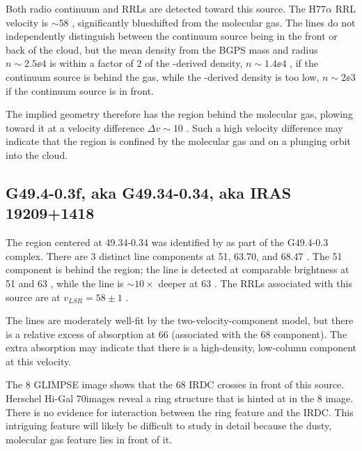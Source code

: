 Both radio continuum and RRLs are detected toward this source.  The H77$\alpha$
RRL velocity is $\sim58$ \kms, significantly blueshifted from the molecular
gas.  The \formaldehyde lines do not independently distinguish between the
continuum source being in the front or back of the cloud, but the mean density
from the BGPS mass and radius $n\sim2.5\ee{4}$ \percc is within a factor of 2
of the \formaldehyde-derived density, $n\sim1.4\ee{4}$ \percc, if the continuum
source is behind the gas, while the \formaldehyde-derived density is too low,
$n\sim2\ee{3}$ \percc if the continuum source is in front.

The implied geometry therefore has the \hii region behind the molecular gas,
plowing toward it at a velocity difference $\Delta v \sim 10$ \kms.  Such a
high velocity difference may indicate that the \hii region is confined by the
molecular gas and on a plunging orbit into the cloud.

\subsection{G49.4-0.3f, aka G49.34-0.34, aka IRAS 19209+1418}
The \hii region centered at 49.34-0.34 was identified by \citet{Mehringer1994a}
as part of the G49.4-0.3 complex.  There are 3 distinct \formaldehyde line
components at 51, 63.70, and 68.47 \kms.  The 51 \kms component is behind the \hii
region; the \thirteenco line is detected at comparable brightness at 51 \kms
and 63 \kms, while the \formaldehyde \oneone line is $\sim10\times$ deeper at
63 \kms.  The RRLs associated with this source are at $v_{LSR}=58 \pm 1$ \kms.

The \formaldehyde lines are moderately well-fit by the two-velocity-component
model, but there is a relative excess of \twotwo absorption at 66 \kms
(associated with the 68 \kms component).  The extra absorption may indicate
that there is a high-density, low-column
component at this velocity.

The 8 \um GLIMPSE image shows that the 68 \kms IRDC crosses in front of this
source.  Herschel Hi-Gal 70\um images reveal a ring structure that is hinted at
in the 8 \um image.  There is no evidence for interaction between the ring
feature and the IRDC.  This intriguing feature will likely be difficult to
study in detail because the dusty, molecular gas feature lies in front of it.

